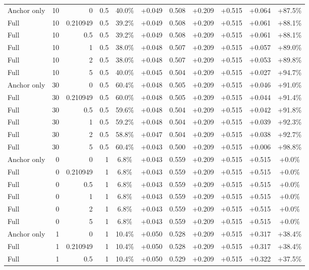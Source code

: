 \begin{table}[htbp]
\begin{tabular}{lrrrccccccc}
Anchor only & 10 & 0 & 0.5 & 40.0\% & +0.049 & 0.508 & +0.209 & +0.515 & +0.064 & +87.5\% \\
Full & 10 & 0.210949 & 0.5 & 39.2\% & +0.049 & 0.508 & +0.209 & +0.515 & +0.061 & +88.1\% \\
Full & 10 & 0.5 & 0.5 & 39.2\% & +0.049 & 0.508 & +0.209 & +0.515 & +0.061 & +88.1\% \\
Full & 10 & 1 & 0.5 & 38.0\% & +0.048 & 0.507 & +0.209 & +0.515 & +0.057 & +89.0\% \\
Full & 10 & 2 & 0.5 & 38.0\% & +0.048 & 0.507 & +0.209 & +0.515 & +0.053 & +89.8\% \\
Full & 10 & 5 & 0.5 & 40.0\% & +0.045 & 0.504 & +0.209 & +0.515 & +0.027 & +94.7\% \\
Anchor only & 30 & 0 & 0.5 & 60.4\% & +0.048 & 0.505 & +0.209 & +0.515 & +0.046 & +91.0\% \\
Full & 30 & 0.210949 & 0.5 & 60.0\% & +0.048 & 0.505 & +0.209 & +0.515 & +0.044 & +91.4\% \\
Full & 30 & 0.5 & 0.5 & 59.6\% & +0.048 & 0.504 & +0.209 & +0.515 & +0.042 & +91.8\% \\
Full & 30 & 1 & 0.5 & 59.2\% & +0.048 & 0.504 & +0.209 & +0.515 & +0.039 & +92.3\% \\
Full & 30 & 2 & 0.5 & 58.8\% & +0.047 & 0.504 & +0.209 & +0.515 & +0.038 & +92.7\% \\
Full & 30 & 5 & 0.5 & 60.4\% & +0.043 & 0.500 & +0.209 & +0.515 & +0.006 & +98.8\% \\
Anchor only & 0 & 0 & 1 & 6.8\% & +0.043 & 0.559 & +0.209 & +0.515 & +0.515 & +0.0\% \\
Full & 0 & 0.210949 & 1 & 6.8\% & +0.043 & 0.559 & +0.209 & +0.515 & +0.515 & +0.0\% \\
Full & 0 & 0.5 & 1 & 6.8\% & +0.043 & 0.559 & +0.209 & +0.515 & +0.515 & +0.0\% \\
Full & 0 & 1 & 1 & 6.8\% & +0.043 & 0.559 & +0.209 & +0.515 & +0.515 & +0.0\% \\
Full & 0 & 2 & 1 & 6.8\% & +0.043 & 0.559 & +0.209 & +0.515 & +0.515 & +0.0\% \\
Full & 0 & 5 & 1 & 6.8\% & +0.043 & 0.559 & +0.209 & +0.515 & +0.515 & +0.0\% \\
Anchor only & 1 & 0 & 1 & 10.4\% & +0.050 & 0.528 & +0.209 & +0.515 & +0.317 & +38.4\% \\
Full & 1 & 0.210949 & 1 & 10.4\% & +0.050 & 0.528 & +0.209 & +0.515 & +0.317 & +38.4\% \\
Full & 1 & 0.5 & 1 & 10.4\% & +0.050 & 0.529 & +0.209 & +0.515 & +0.322 & +37.5\% \\

\end{tabular}
\end{table}
